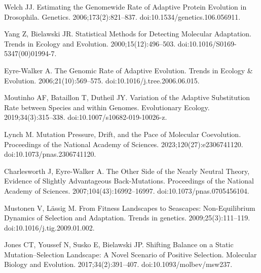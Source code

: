 \documentclass{article}
\begin{document}
\begin{thebibliography}{10}
        Welch JJ.
        \newblock Estimating the {{Genomewide Rate}} of {{Adaptive Protein Evolution}}
        in {{Drosophila}}.
        \newblock Genetics. 2006;173(2):821--837.
        \newblock doi:{10.1534/genetics.106.056911}.

        Yang Z, Bielawski JR.
        \newblock Statistical Methods for Detecting Molecular Adaptation.
        \newblock Trends in Ecology and Evolution. 2000;15(12):496--503.
        \newblock doi:{10.1016/S0169-5347(00)01994-7}.

        {Eyre-Walker} A.
        \newblock The Genomic Rate of Adaptive Evolution.
        \newblock Trends in Ecology \& Evolution. 2006;21(10):569--575.
        \newblock doi:{10.1016/j.tree.2006.06.015}.

        Moutinho AF, Bataillon T, Dutheil JY.
        \newblock Variation of the Adaptive Substitution Rate between Species and
        within Genomes.
        \newblock Evolutionary Ecology. 2019;34(3):315--338.
        \newblock doi:{10.1007/s10682-019-10026-z}.

        Lynch M.
        \newblock Mutation Pressure, Drift, and the Pace of Molecular Coevolution.
        \newblock Proceedings of the National Academy of Sciences.
        2023;120(27):e2306741120.
        \newblock doi:{10.1073/pnas.2306741120}.

        Charlesworth J, {Eyre-Walker} A.
        \newblock The Other Side of the Nearly Neutral Theory, Evidence of Slightly
        Advantageous Back-Mutations.
        \newblock Proceedings of the National Academy of Sciences.
        2007;104(43):16992--16997.
        \newblock doi:{10.1073/pnas.0705456104}.

        Mustonen V, L{\"a}ssig M.
        \newblock From Fitness Landscapes to Seascapes: Non-Equilibrium Dynamics of
        Selection and Adaptation.
        \newblock Trends in genetics. 2009;25(3):111--119.
        \newblock doi:{10.1016/j.tig.2009.01.002}.

        Jones CT, Youssef N, Susko E, Bielawski JP.
        \newblock Shifting Balance on a Static Mutation--Selection Landscape: A Novel
        Scenario of Positive Selection.
        \newblock Molecular Biology and Evolution. 2017;34(2):391--407.
        \newblock doi:{10.1093/molbev/msw237}.


\end{thebibliography}
\end{document}
